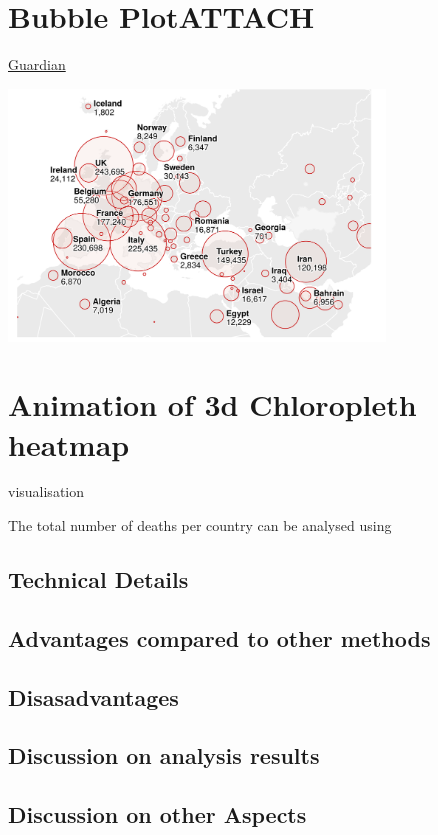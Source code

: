 \documentclass[11pt]{article}
\begin{document}
\section{Bubble Plot\hfill{}\textsc{ATTACH}}
\label{sec:org2b0c0e7}
\href{https://www.theguardian.com/world/2020/may/18/coronavirus-world-map-which-countries-have-the-most-cases-and-deaths}{Guardian}


\begin{center}
\includegraphics[width=10cm]{./_20200518_184850screenshot.png}
\end{center}




\section{Animation of 3d Chloropleth heatmap}
\label{sec:org89448c5}

visualisation

The total number of deaths per country can be analysed using
\subsection{Technical Details}
\label{sec:orgc22965a}
\subsection{Advantages compared to other methods}
\label{sec:orgf9a369f}
\subsection{Disasadvantages}
\label{sec:org9ac1292}
\subsection{Discussion on analysis results}
\label{sec:org434bc6c}
\subsection{Discussion on other Aspects}
\label{sec:orgf2078a4}
\end{document}
